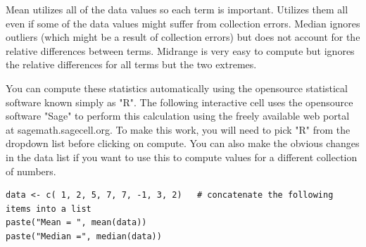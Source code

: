 \documentclass[10pt,]{book}
\theoremstyle{plain}
\theoremstyle{definition}
\theoremstyle{definition}
\theoremstyle{definition}
\numberwithin{equation}{section}
\begin{document}
Mean utilizes all of the data values so each term is important. Utilizes them all even if some of the data values might suffer from collection errors.  Median ignores outliers (which might be a result of collection errors) but does not account for the relative differences between terms. Midrange is very easy to compute but ignores the relative differences for all terms but the two extremes.
%
\par

You can compute these statistics automatically using the opensource statistical software known simply as "R".  The following interactive cell uses the opensource software "Sage" to perform this calculation using the freely available web portal at sagemath.sagecell.org.  To make this work, you will need to pick "R" from the dropdown list before clicking on compute. You can also make the obvious changes in the data list if you want to use this to compute values for a different collection of numbers.
%
\begin{lstlisting}[style=sageinput]
data <- c( 1, 2, 5, 7, 7, -1, 3, 2)   # concatenate the following items into a list
paste("Mean = ", mean(data))
paste("Median =", median(data))
\end{lstlisting}
\end{document}
